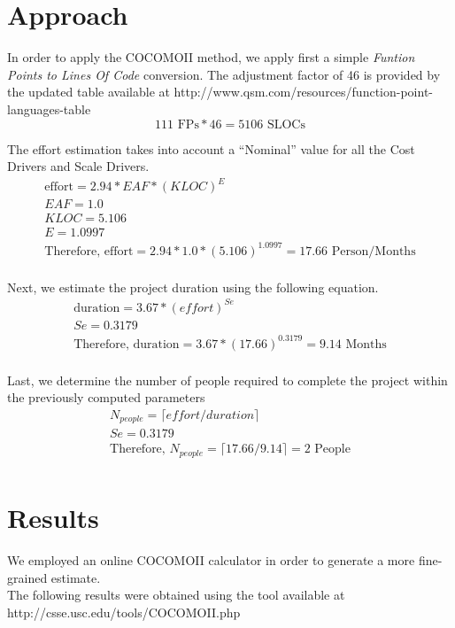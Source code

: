 \section{Approach}

In order to apply the COCOMOII method, we apply first a simple \textit{Funtion Points to Lines Of Code}
conversion. The adjustment factor of 46 is provided by the updated table available at 
http://www.qsm.com/resources/function-point-languages-table
\begin{equation}
 111 \text{ FPs} * 46 = 5106 \text{ SLOCs}
\end{equation}

The effort estimation takes into account a ``Nominal'' value for all the Cost Drivers and Scale Drivers.
\begin{multline}
 \text{effort} = 2.94 * \textit{EAF} * (\textit{KLOC})^E \\
 \textit{EAF} = 1.0 \\
 \textit{KLOC} = 5.106 \\
 E = 1.0997 \\
 \text{Therefore, effort} = 2.94 * 1.0 * (5.106)^{1.0997} = 17.66 \text{ Person/Months} \\
\end{multline}

Next, we estimate the project duration using the following equation.
\begin{multline}
 \text{duration} = 3.67 * (\textit{effort})^\textit{Se} \\
 \textit{Se} = 0.3179 \\
 \text{Therefore, duration} = 3.67 * (17.66)^{0.3179} = 9.14 \text{ Months} \\
\end{multline}

Last, we determine the number of people required to complete the project within
the previously computed parameters
\begin{multline}
 N_{\textit{people}} = \lceil \textit{effort} / \textit{duration} \rceil \\
 \textit{Se} = 0.3179 \\
 \text{Therefore, } N_{\textit{people}} = \lceil 17.66 / 9.14 \rceil = 2 \text{ People} \\
\end{multline}

\section{Results}
We employed an online COCOMOII calculator in order to generate a more fine-grained estimate. \\
The following results were obtained using the tool available at \\
http://csse.usc.edu/tools/COCOMOII.php \\




